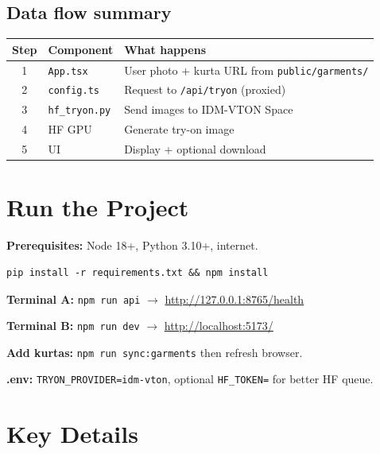 \documentclass[10pt,a4paper]{article}
\begin{document}
\subsection{Data flow summary}
\begin{table}[h]
\centering\small
\begin{tabular}{@{}cll@{}}
\toprule
Step & Component & What happens \\
\midrule
1 & \texttt{App.tsx} & User photo + kurta URL from \texttt{public/garments/} \\
2 & \texttt{config.ts} & Request to \texttt{/api/tryon} (proxied) \\
3 & \texttt{hf\_tryon.py} & Send images to IDM-VTON Space \\
4 & HF GPU & Generate try-on image \\
5 & UI & Display + optional download \\
\bottomrule
\end{tabular}
\end{table}

\section{Run the Project}
\textbf{Prerequisites:} Node 18+, Python 3.10+, internet.

\begin{lstlisting}
pip install -r requirements.txt && npm install
\end{lstlisting}

\textbf{Terminal A:} \texttt{npm run api} $\rightarrow$ \url{http://127.0.0.1:8765/health}

\textbf{Terminal B:} \texttt{npm run dev} $\rightarrow$ \url{http://localhost:5173/}

\textbf{Add kurtas:} \texttt{npm run sync:garments} then refresh browser.

\textbf{.env:} \texttt{TRYON\_PROVIDER=idm-vton}, optional \texttt{HF\_TOKEN=} for better HF queue.

\section{Key Details}
\end{document}

